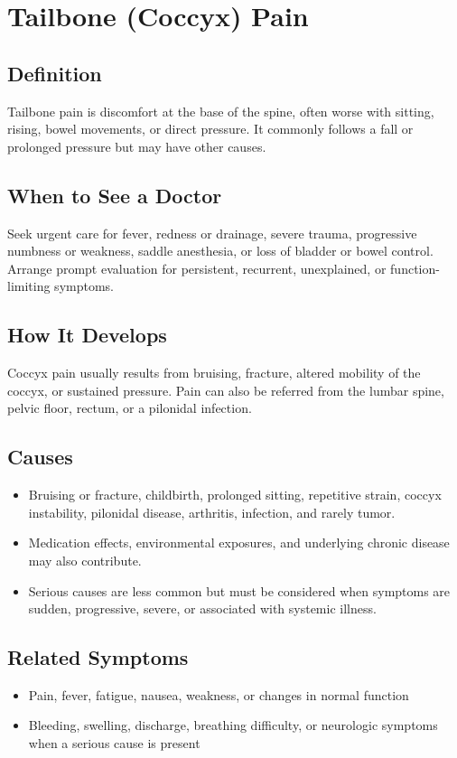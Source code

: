\chapter{Tailbone (Coccyx) Pain}

\section*{Definition}
Tailbone pain is discomfort at the base of the spine, often worse with sitting, rising, bowel movements, or direct pressure. It commonly follows a fall or prolonged pressure but may have other causes.

\section*{When to See a Doctor}
Seek urgent care for fever, redness or drainage, severe trauma, progressive numbness or weakness, saddle anesthesia, or loss of bladder or bowel control. Arrange prompt evaluation for persistent, recurrent, unexplained, or function-limiting symptoms.

\section*{How It Develops}
Coccyx pain usually results from bruising, fracture, altered mobility of the coccyx, or sustained pressure. Pain can also be referred from the lumbar spine, pelvic floor, rectum, or a pilonidal infection.

\section*{Causes}
\begin{itemize}
  \item Bruising or fracture, childbirth, prolonged sitting, repetitive strain, coccyx instability, pilonidal disease, arthritis, infection, and rarely tumor.
  \item Medication effects, environmental exposures, and underlying chronic disease may also contribute.
  \item Serious causes are less common but must be considered when symptoms are sudden, progressive, severe, or associated with systemic illness.
\end{itemize}

\section*{Related Symptoms}
\begin{itemize}
  \item Pain, fever, fatigue, nausea, weakness, or changes in normal function
  \item Bleeding, swelling, discharge, breathing difficulty, or neurologic symptoms when a serious cause is present
\end{itemize}


